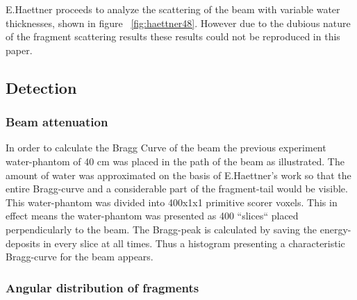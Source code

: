 E.Haettner proceeds to analyze the scattering of the beam with variable water thicknesses, shown in figure ~\ref{fig:haettner48}. However due to the dubious nature of the fragment scattering results these results could not be reproduced in this paper.


\subsection{Detection}

\subsubsection{Beam attenuation}

In order to calculate the Bragg Curve of the beam the previous experiment water-phantom of 40 cm was placed in the path of the beam as illustrated. The amount of water was approximated on the basis of E.Haettner's work so that the entire Bragg-curve and a considerable part of the fragment-tail would be visible. This water-phantom was divided into 400x1x1 primitive scorer voxels. This in effect means the water-phantom was presented as 400 ``slices`` placed perpendicularly to the beam. The Bragg-peak is calculated by saving the energy-deposits in every slice at all times. Thus a histogram presenting a characteristic Bragg-curve for the beam appears.

\subsubsection{Angular distribution of fragments\label{AngularDistributionText}}

